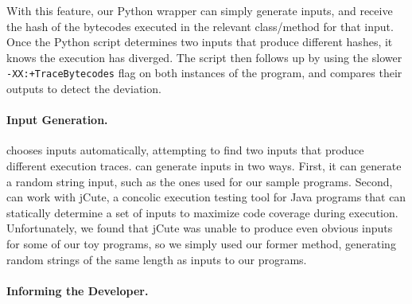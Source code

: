 With this feature, our Python wrapper can simply generate inputs, and receive
the hash of the bytecodes executed in the relevant class/method for that input.
Once the Python script determines two inputs that produce different hashes, it
knows the execution has diverged. The script then follows up by using the
slower \texttt{-XX:+TraceBytecodes} flag on both instances of the program, and
compares their outputs to detect the deviation. 



\paragraph{Input Generation.}
\jcupid chooses inputs automatically, attempting to find two inputs that produce
different execution traces. \jcupid can generate inputs in two ways. First, it
can generate a random string input, such as the ones used for our sample
programs. Second, \jcupid can work with jCute, a concolic execution testing tool
for Java programs that can statically determine a set of inputs to maximize code
coverage during execution. Unfortunately, we found that jCute was unable to
produce even obvious inputs for some of our toy programs, so we simply used our
former method, generating random strings of the same length as inputs to our
programs.


\paragraph{Informing the Developer.}

